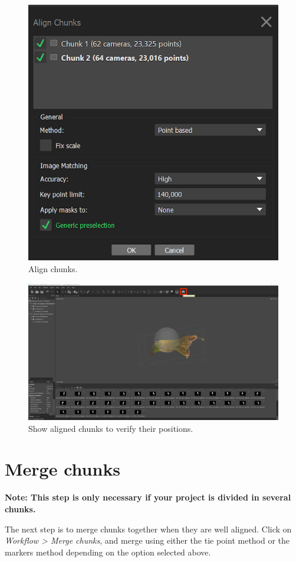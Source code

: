 \documentclass[
]{book}
\begin{document}
\begin{figure}

{\centering \includegraphics[width=0.5\linewidth]{Figures/metashape_align_chunks} 

}

\caption{Align chunks.}\label{fig:alignchunks}
\end{figure}
\begin{figure}

{\centering \includegraphics[width=1\linewidth]{Figures/metashape_show_aligned_chunks} 

}

\caption{Show aligned chunks to verify their positions.}\label{fig:showalignedchunks}
\end{figure}

\hypertarget{merge-chunks}{%
\section{Merge chunks}\label{merge-chunks}}

\textbf{Note: This step is only necessary if your project is divided in
several chunks.}

The next step is to merge chunks together when they are well aligned.
Click on \emph{Workflow \textgreater{} Merge chunks}, and merge using either the tie
point method or the markers method depending on the option selected
above.
\end{document}
